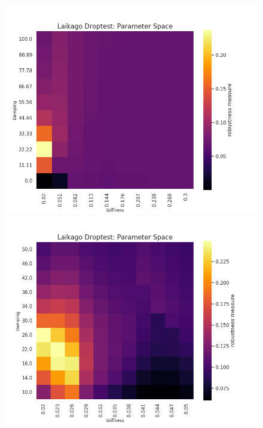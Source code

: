     \begin{figure}[h]
        \centering
        \begin{minipage}{0.33\textwidth}
            \centering
            \includegraphics[width=\textwidth]{figures/droptest_ps_full_correct.png} %
        \end{minipage}\hfill
        \begin{minipage}{0.33\textwidth}
            \centering
            \includegraphics[width=\textwidth]{figures/droptest_ps_zoom1_correct.png} %

\end{minipage}
\end{figure}
